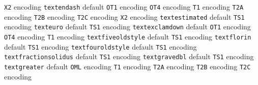 \documentclass[twoside]{ltxdoc}
\makeatletter
\renewenvironment{theindex}{%
   \@restonecoltrue
   \if@twocolumn\@restonecolfalse\fi
   \columnseprule \z@
   \columnsep 35\p@
   \twocolumn[\index@prologue]%
   \IndexParms
   \let\item\@idxitem
   \ignorespaces
}{\if@restonecol\onecolumn\else\clearpage\fi}
\makeatother
\begin{document}
\begin{theindex}
    \subitem \texttt  {X2} encoding\pfill {}
  \item \texttt  {textendash}\efill 
    \subitem default\pfill {}
    \subitem \texttt  {OT1} encoding\pfill {}
    \subitem \texttt  {OT4} encoding\pfill {}
    \subitem \texttt  {T1} encoding\pfill {}
    \subitem \texttt  {T2A} encoding\pfill {}
    \subitem \texttt  {T2B} encoding\pfill {}
    \subitem \texttt  {T2C} encoding\pfill {}
    \subitem \texttt  {X2} encoding\pfill {}
  \item \texttt  {textestimated}\efill 
    \subitem default\pfill {}
    \subitem \texttt  {TS1} encoding\pfill {}
  \item \texttt  {texteuro}\efill 
    \subitem default\pfill {}
    \subitem \texttt  {TS1} encoding\pfill {}
  \item \texttt  {textexclamdown}\efill 
    \subitem default\pfill {}
    \subitem \texttt  {OT1} encoding\pfill {}
    \subitem \texttt  {OT4} encoding\pfill {}
    \subitem \texttt  {T1} encoding\pfill {}
  \item \texttt  {textfiveoldstyle}\efill 
    \subitem default\pfill {}
    \subitem \texttt  {TS1} encoding\pfill {}
  \item \texttt  {textflorin}\efill 
    \subitem default\pfill {}
    \subitem \texttt  {TS1} encoding\pfill {}
  \item \texttt  {textfouroldstyle}\efill 
    \subitem default\pfill {}
    \subitem \texttt  {TS1} encoding\pfill {}
  \item \texttt  {textfractionsolidus}\efill 
    \subitem default\pfill {}
    \subitem \texttt  {TS1} encoding\pfill {}
  \item \texttt  {textgravedbl}\efill 
    \subitem default\pfill {}
    \subitem \texttt  {TS1} encoding\pfill {}
  \item \texttt  {textgreater}\efill 
    \subitem default\pfill {}
    \subitem \texttt  {OML} encoding\pfill {}
    \subitem \texttt  {T1} encoding\pfill {}
    \subitem \texttt  {T2A} encoding\pfill {}
    \subitem \texttt  {T2B} encoding\pfill {}
    \subitem \texttt  {T2C} encoding\pfill {}

\end{theindex}
\end{document}
